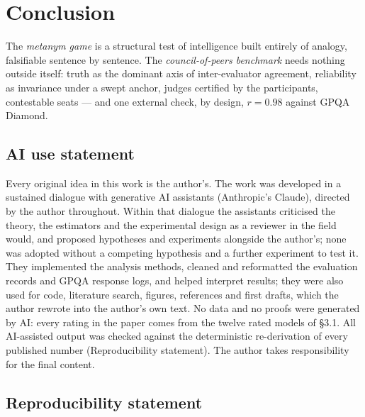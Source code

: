 \documentclass{article}
\begin{document}
\section{Conclusion}\label{conclusion}

The \emph{metanym game} is a structural test of intelligence built entirely of analogy, falsifiable sentence by sentence. The \emph{council-of-peers benchmark} needs nothing outside itself: truth as the dominant axis of inter-evaluator agreement, reliability as invariance under a swept anchor, judges certified by the participants, contestable seats --- and one external check, by design, \(r = 0.98\) against GPQA Diamond.\label{endmain}

\subsection*{AI use statement}

Every original idea in this work is the author's. The work was developed in a sustained dialogue with generative AI assistants (Anthropic's Claude), directed by the author throughout. Within that dialogue the assistants criticised the theory, the estimators and the experimental design as a reviewer in the field would, and proposed hypotheses and experiments alongside the author's; none was adopted without a competing hypothesis and a further experiment to test it. They implemented the analysis methods, cleaned and reformatted the evaluation records and GPQA response logs, and helped interpret results; they were also used for code, literature search, figures, references and first drafts, which the author rewrote into the author's own text. No data and no proofs were generated by AI: every rating in the paper comes from the twelve rated models of \S{}3.1. All AI-assisted output was checked against the deterministic re-derivation of every published number (Reproducibility statement). The author takes responsibility for the final content.

\subsection*{Reproducibility statement}
\end{document}
